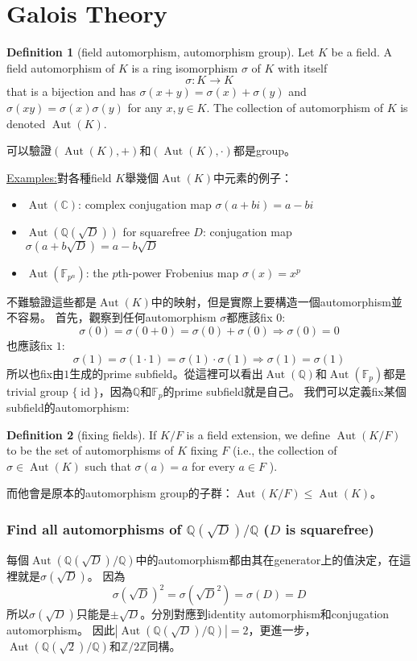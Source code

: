 \documentclass{article}
\theoremstyle{definition}
\newcommand{\ex}{\noindent\underline{Examples:}}
\newtheorem{dfn}{Definition}
\newcommand{\CC}{\mathbb C}
\newcommand{\FF}{\mathbb F}
\newcommand{\QQ}{\mathbb Q}
\newcommand{\ZZ}{\mathbb Z}
\DeclareMathOperator{\Aut}{Aut}
\DeclareMathOperator{\id}{id}
\begin{document}
\clearpage
\section{Galois Theory}

\begin{dfn}[field automorphism, automorphism group]
	Let $K$ be a field. A field automorphism of $K$ is a ring isomorphism $\sigma$ of $K$ with itself 
	\[\sigma:K\to K\]
	that is a bijection and has $\sigma(x+y)=\sigma(x)+\sigma(y)$ and $\sigma(xy)=\sigma(x)\sigma(y)$ for any $x,y\in K$.
	The collection of automorphism of $K$ is denoted $\Aut(K)$.
\end{dfn}
可以驗證$(\Aut(K),+)$和$(\Aut(K),\cdot)$都是group。

\ex 對各種field $K$舉幾個$\Aut(K)$中元素的例子：

\begin{itemize}
	\item $\Aut(\CC)$: complex conjugation map $\sigma(a+bi)=a-bi$
	\item $\Aut(\QQ(\sqrt{D}))$ for squarefree $D$: conjugation map $\sigma(a+b\sqrt{D})=a-b\sqrt{D}$
	\item $\Aut(\FF_{p^n})$: the $p$th-power Frobenius map $\sigma(x)=x^p$ 
\end{itemize}

不難驗證這些都是$\Aut(K)$中的映射，但是實際上要構造一個automorphism並不容易。
首先，觀察到任何automorphism $\sigma$都應該fix $0$:
\[\sigma(0)=\sigma(0+0)=\sigma(0)+\sigma(0) \Rightarrow \sigma(0)=0\]
也應該fix $1$:
\[\sigma(1)=\sigma(1\cdot 1)=\sigma(1)\cdot\sigma(1) \Rightarrow \sigma(1)=\sigma(1)\]
所以也fix由$1$生成的prime subfield。從這裡可以看出$\Aut(\QQ)$和$\Aut(\FF_p)$都是
trivial group $\{\id\}$，因為$\QQ$和$\FF_p$的prime subfield就是自己。
我們可以定義fix某個subfield的automorphism:
\begin{dfn}[fixing fields]
	If $K/F$ is a field extension, we define $\Aut(K/F)$ to be the set of
automorphisms of $K$ fixing $F$ (i.e., the collection of $\sigma\in \Aut(K)$
such that $\sigma(a)=a$ for every $a\in F$ ).
\end{dfn}
而他會是原本的automorphism group的子群：$\Aut(K/F)\le \Aut(K)$。

\subsubsection*{Find all automorphisms of $\QQ(\sqrt{D})/\QQ$ ($D$ is squarefree)}
每個$\Aut(\QQ(\sqrt{D})/\QQ)$中的automorphism都由其在generator上的值決定，在這裡就是$\sigma(\sqrt{D})$。
因為
\[\sigma(\sqrt{D})^2=\sigma(\sqrt{D}^2)=\sigma(D)=D\]
所以$\sigma(\sqrt{D})$只能是$\pm\sqrt{D}$。分別對應到identity automorphism和conjugation automorphism。
因此$|\Aut(\QQ(\sqrt{D})/\QQ)|=2$，更進一步，$\Aut(\QQ(\sqrt{2})/\QQ)$和$\ZZ/2\ZZ$同構。
\end{document}
